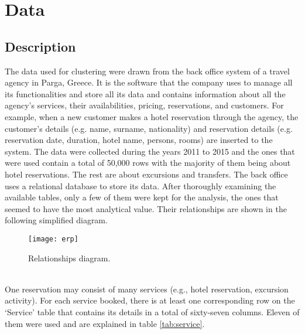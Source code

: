 \section{Data}

\subsection{Description}
The data used for clustering were drawn from the back office system of a travel agency in Parga, Greece. It is the software that the company uses to manage all its functionalities and store all its data and contains information about all the agency's services, their availabilities, pricing, reservations, and customers. For example, when a new customer makes a hotel reservation through the agency, the customer's details (e.g. name, surname, nationality) and reservation details (e.g. reservation date, duration, hotel name, persons, rooms) are inserted to the system. The data were collected during the years 2011 to 2015 and the ones that were used contain a total of 50,000 rows with the majority of them being about hotel reservations. The rest are about excursions and transfers. The back office uses a relational database to store its data. After thoroughly examining the available tables, only a few of them were kept for the analysis, the ones that seemed to have the most analytical value. Their relationships are shown in the following simplified diagram.
\begin{figure}[ht]
\centering
\texttt{[image: erp]}
\caption{Relationships diagram.}
\label{fig:erp}
\end{figure}
\\
One reservation may consist of many services (e.g., hotel reservation, excursion activity). For each service booked, there is at least one corresponding row on the `Service' table that contains its details in a total of sixty-seven columns. Eleven of them were used and are explained in table \ref{tab:service}.
